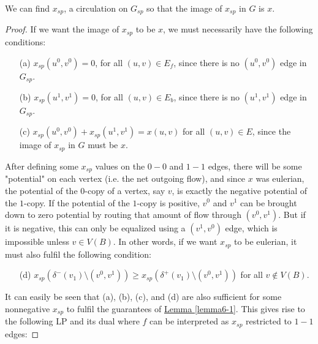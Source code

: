 \documentclass[./main.tex]{subfiles}
\begin{document}
			\begin{lemma}\label{lemma6-1}
				We can find $x_{sp}$, a circulation on $G_{sp}$ so that the image of $x_{sp}$ in $G$ is $x$.
			\end{lemma}
			\begin{proof}
			If we want the image of $x_{sp}$ to be $x$, we must necessarily have the following conditions:
				\begin{itemize}
					\item[(a)] $x_{sp}(u^0,v^0) = 0$, for all $(u,v)\in E_f$, since there is no $(u^0,v^0)$ edge in $G_{sp}$.

					\item[(b)] $x_{sp}(u^1,v^1) = 0$, for all $(u,v)\in E_b$, since there is no $(u^1,v^1)$ edge in $G_{sp}$.

					\item[(c)] $x_{sp}(u^0,v^0)+x_{sp}(u^1,v^1) = x(u,v)$ for all $(u,v)\in E$, since the image of $x_{sp}$ in $G$ must be $x$.
				\end{itemize}

	After defining some $x_{sp}$ values on the $0-0$ and $1-1$ edges, there will be some "potential" on each vertex (i.e. the net outgoing flow), and since $x$ was eulerian, the potential of the $0$-copy of a vertex, say $v$, is exactly the negative potential of the $1$-copy.
			If the potential of the $1$-copy is positive, $v^0$ and $v^1$ can be brought down to zero potential by routing that amount of flow through $(v^0,v^1)$.
			But if it is negative, this can only be equalized using a $(v^1,v^0)$ edge, which is impossible unless $v\in V(B)$. In other words, if we want $x_{sp}$ to be eulerian, it must also fulfil the following condition:
			\begin{itemize}
				\item[(d)] $x_{sp}(\delta^-(v_1)\setminus (v^0,v^1) )\geqslant x_{sp}(\delta^+(v_1)\setminus (v^0,v^1))$ for all $v\notin V(B)$.
			\end{itemize}

			It can easily be seen that (a), (b), (c), and (d) are also sufficient for some nonnegative $x_{sp}$ to fulfil the guarantees of \hyperref[lemma6-1]{Lemma \ref{lemma6-1}}.
			 This gives rise to the following LP and its dual where $f$ can be interpreted as $x_{sp}$ restricted to $1-1$ edges:
			 \vspace{2mm}


\end{proof}
\end{document}
